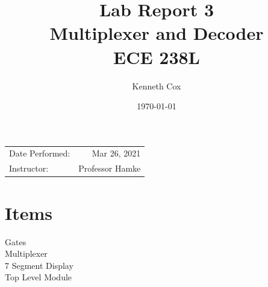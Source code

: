 \documentclass{article}
\title{Lab Report 3 \\ Multiplexer and Decoder \\ ECE 238L \\} %
\author{Kenneth Cox}
\date{\today} %
\begin{document}
\maketitle %

\begin{center}
\begin{tabular}{l r}
Date Performed: & Mar 26, 2021 \\ %
Instructor: & Professor Hamke %
\end{tabular}
\end{center}





\section{Items}

\begin{description}
\item[Gates]
\item[Multiplexer]
\item[7 Segment Display]
\item[Top Level Module]
\end{description} 
 
\end{document}
